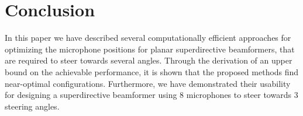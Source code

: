 \documentclass[9pt]{article}
\begin{document}
\vspace{-0.2cm}
\section{Conclusion}
\vspace{-0.2cm}
In this paper we have described several computationally efficient approaches for optimizing the microphone positions for planar superdirective beamformers, that are required to steer towards several angles. Through the derivation of an upper bound on the achievable performance, it is shown that the proposed methods find near-optimal configurations. Furthermore, we have demonstrated their usability for designing a superdirective beamformer using $8$ microphones to steer towards $3$ steering angles.
\end{document}
